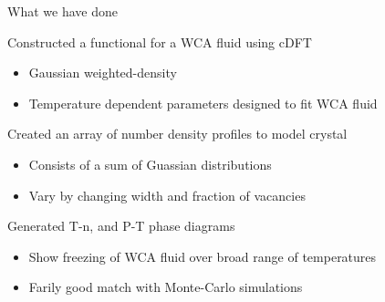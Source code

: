 \documentclass{beamer}
\begin{document}
\begin{frame}{What we have done}
        \begin{block}{Constructed a functional for a WCA fluid using cDFT}
            \begin{itemize}
              \item Gaussian weighted-density  
              \item Temperature dependent parameters designed to fit WCA fluid
           \end{itemize}
        \end{block}
        \begin{block}{Created an array of number density profiles to model crystal}
           \begin{itemize}
              \item Consists of a sum of Guassian distributions %
              \item Vary by changing width and fraction of vacancies
           \end{itemize}
         \end{block}
         \begin{block}{Generated T-n, and P-T phase diagrams}
           \begin{itemize}
              \item Show freezing of WCA fluid over broad range of temperatures
              \item Farily good match with Monte-Carlo simulations
           \end{itemize}
         \end{block}
\end{frame}
\end{document}
